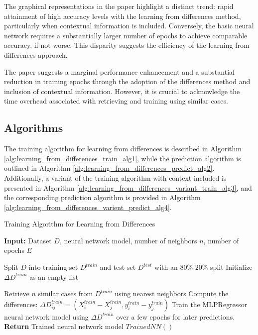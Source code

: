\documentclass[a4paper, 12pt]{report}
\begin{document}
The graphical representations in the paper highlight a distinct trend: rapid attainment of high accuracy levels with the learning from differences method,
particularly when contextual information is included. Conversely, the basic neural network requires a substantially larger number of epochs to achieve comparable accuracy, if not worse.
This disparity suggests the efficiency of the learning from differences approach.

The paper suggests a marginal performance enhancement and a substantial reduction in training epochs through the adoption of the differences method and inclusion of contextual information.
However, it is crucial to acknowledge the time overhead associated with retrieving and training using similar cases.

\subsection{Algorithms}

The training algorithm for learning from differences is described in Algorithm \ref{alg:learning_from_differences_train_alg1}, while the prediction algorithm is outlined in Algorithm \ref{alg:learning_from_differences_predict_alg2}.
Additionally, a variant of the training algorithm with context included is presented in Algorithm \ref{alg:learning_from_differences_variant_train_alg3}, and the
corresponding prediction algorithm is provided in Algorithm \ref{alg:learning_from_differences_varient_predict_alg4}.
\begin{algorithm}
	\caption{Training Algorithm for Learning from Differences}
	\label{alg:learning_from_differences_train_alg1}

	\textbf{Input:} Dataset $D$, neural network model, number of neighbors $n$, number of epochs $E$
	\begin{algorithmic}[1]
        \State Split $D$ into training set $D^{train}$ and test set $D^{test}$ with an $80\%$-$20\%$ split
        \State Initialize $\Delta D^{train}$ as an empty list
        
            \State Retrieve $n$ similar cases from $D^{train}$ using nearest neighbors
                \State Compute the differences: $\Delta D^{train}_{ij} = (X^{train}_i - X^{train}_j, y^{train}_i - y^{train}_j)$
            \EndFor
        \EndFor
        \State Train the MLPRegressor neural network model using $\Delta D^{train}$ over a few epochs for later predictions.
        \State \textbf{Return} Trained neural network model $Trained NN()$
    \end{algorithmic}
\end{algorithm}
\end{document}
